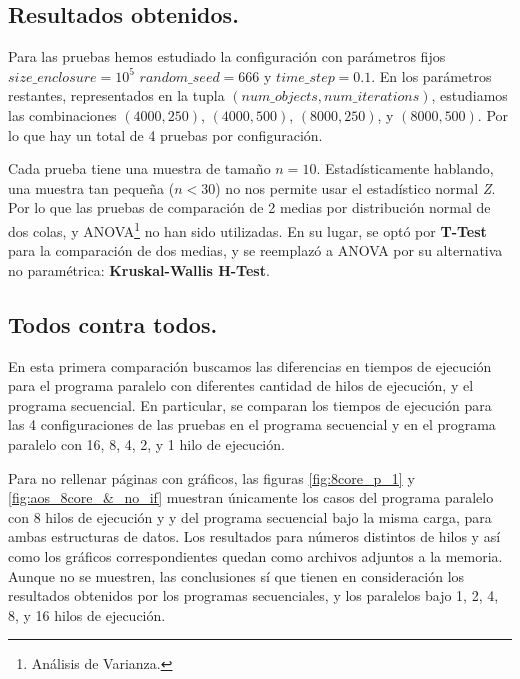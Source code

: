 \documentclass{article}
\begin{document}
\subsection{Resultados obtenidos.}
Para las pruebas hemos estudiado la configuración con parámetros fijos ${size\_enclosure}=10^5$ ${random\_seed}=666$ y
${time\_step}=0.1$. En los parámetros restantes, representados en la tupla $({num\_objects}, {num\_iterations})$,
estudiamos las combinaciones $(4000, 250)$, $(4000, 500)$, $(8000, 250)$, y $(8000, 500)$. Por lo que hay
un total de 4 pruebas por configuración.

Cada prueba tiene una muestra de tamaño ${n}=10$. Estadísticamente
hablando, una muestra tan pequeña ($n < 30$) no nos permite usar el estadístico normal \textit{Z}.
Por lo que las pruebas de comparación de 2 medias por distribución normal de dos colas, y ANOVA\footnote{Análisis de Varianza.}
no han sido utilizadas. En su lugar, se optó por \textbf{T-Test} para la comparación de dos medias, y se reemplazó a ANOVA
por su alternativa no paramétrica: \textbf{Kruskal-Wallis H-Test}.

\subsection{Todos contra todos.\label{kruskal}}
En esta primera comparación buscamos las diferencias en tiempos de ejecución para el programa
paralelo con diferentes cantidad de hilos de ejecución, y el programa secuencial. En particular, se comparan
los tiempos de ejecución para las 4 configuraciones de las pruebas en el programa secuencial y en el programa paralelo
con 16, 8, 4, 2, y 1 hilo de ejecución.

Para no rellenar páginas con gráficos, las figuras \ref{fig:8core_p_1} y \ref{fig:aos_8core_&_no_if} muestran únicamente los casos del programa paralelo con 8 hilos de ejecución y
y del programa secuencial bajo la misma carga, para ambas estructuras de datos. Los resultados para números distintos de hilos y
así como los gráficos correspondientes quedan como archivos adjuntos a la memoria. Aunque no se muestren, las
conclusiones sí que tienen en consideración los resultados obtenidos por los programas secuenciales, y los paralelos bajo 1, 2, 4, 8, y 16 hilos de ejecución.
\end{document}
